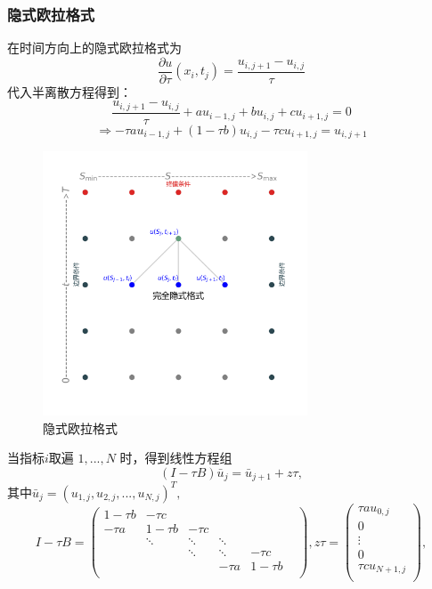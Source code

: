 \documentclass{article}
\begin{document}
 


\subsubsection{隐式欧拉格式}

在时间方向上的隐式欧拉格式为$$\frac{\partial u}{\partial \tau}(x_i, t_j) = \frac{u_{i, j+1} - u_{i, j}}{\tau}$$
代入半离散方程得到：$$\frac{u_{i, j+1} - u_{i, j}}{\tau} + au_{i-1, j} + bu_{i, j} + cu_{i+1, j} = 0$$
$$\Rightarrow -\tau au_{i-1, j} + (1 - \tau b)u_{i, j} - \tau cu_{i+1, j} = u_{i, j+1}$$


\begin{figure}[H]
  \centering
  \includegraphics[width=0.7\textwidth,height=0.7\textwidth]{Images/3_ImpEu.png}
  \caption{隐式欧拉格式}
  \label{fig:3_ImpEu}
\end{figure}


当指标$i$取遍 $1,...,N$ 时，得到线性方程组$$(I - \tau B)\bar{u}_{j} = \bar{u}_{j+1} + z\tau,$$
其中$\bar{u}_{j} = (u_{1, j}, u_{2, j},...,u_{N, j})^T,$
$$
I - \tau B = \begin{pmatrix}
                1 -\tau b  &   -\tau c    &            &            &            & \\
                -\tau a    &   1 -\tau b  &   -\tau c  &            &            & \\
                           &   \ddots     &   \ddots   &   \ddots   &            & \\
                           &              &   \ddots   &   \ddots   &  -\tau c   & \\
                           &              &            &   -\tau a  &  1 -\tau b & \\
            \end{pmatrix},
z\tau = \begin{pmatrix}
            \tau au_{0, j}   \\
            0                \\
            \vdots           \\
            0                \\
            \tau cu_{N+1, j} \\
        \end{pmatrix},
$$
\end{document}
